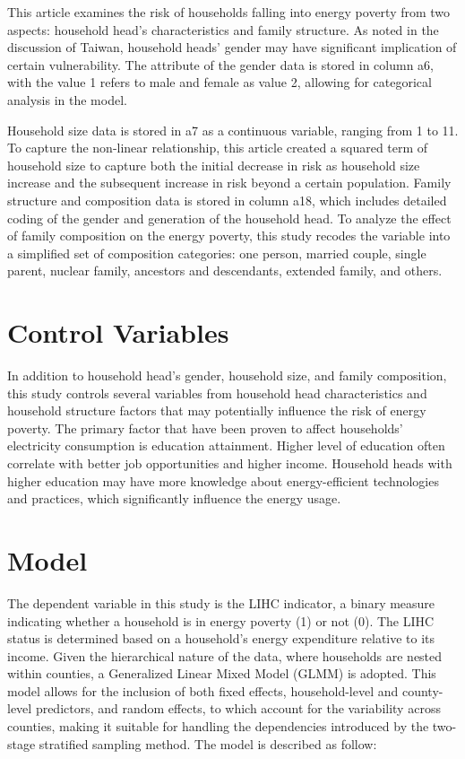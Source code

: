 \documentclass[
  twoside,
  openright,
  degree    = master,               %
  language  = english,              %
  fontset   = overleaf,             %
  watermark = true,                 %
  doi       = true,                 %
]{ntuthesis}
\begin{document}
This article examines the risk of households falling into energy poverty
from two aspects: household head's characteristics and family structure.
As noted in the discussion of Taiwan, household heads' gender may have
significant implication of certain vulnerability. The attribute of the
gender data is stored in column a6, with the value 1 refers to male and
female as value 2, allowing for categorical analysis in the model.

Household size data is stored in a7 as a continuous variable, ranging
from 1 to 11. To capture the non-linear relationship, this article
created a squared term of household size to capture both the initial
decrease in risk as household size increase and the subsequent increase
in risk beyond a certain population. Family structure and composition
data is stored in column a18, which includes detailed coding of the
gender and generation of the household head. To analyze the effect of
family composition on the energy poverty, this study recodes the
variable into a simplified set of composition categories: one person,
married couple, single parent, nuclear family, ancestors and
descendants, extended family, and others.

\hypertarget{control-variables}{%
\section{Control Variables}\label{control-variables}}

In addition to household head's gender, household size, and family
composition, this study controls several variables from household head
characteristics and household structure factors that may potentially
influence the risk of energy poverty. The primary factor that have been
proven to affect households' electricity consumption is education
attainment. Higher level of education often correlate with better job
opportunities and higher income. Household heads with higher education
may have more knowledge about energy-efficient technologies and
practices, which significantly influence the energy usage.

\hypertarget{model}{%
\section{Model}\label{model}}

The dependent variable in this study is the LIHC indicator, a binary
measure indicating whether a household is in energy poverty (1) or not
(0). The LIHC status is determined based on a household's energy
expenditure relative to its income. Given the hierarchical nature of the
data, where households are nested within counties, a Generalized Linear
Mixed Model (GLMM) is adopted. This model allows for the inclusion of
both fixed effects, household-level and county-level predictors, and
random effects, to which account for the variability across counties,
making it suitable for handling the dependencies introduced by the
two-stage stratified sampling method. The model is described as follow:
\end{document}
